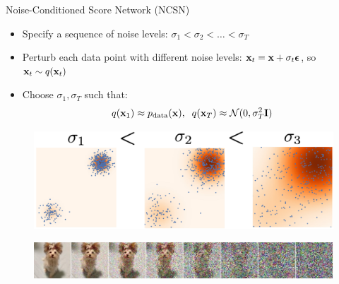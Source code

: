\documentclass{beamer}
\begin{document}
\begin{frame}{Noise-Conditioned Score Network (NCSN)}
	\begin{itemize}
		\item Specify a sequence of noise levels: $\sigma_1 < \sigma_2 < \dots < \sigma_T$
		\item Perturb each data point with different noise levels: $\mathbf{x}_t = \mathbf{x} + \sigma_t \boldsymbol{\epsilon}$, so $\mathbf{x}_t \sim q(\mathbf{x}_t)$
		\item Choose $\sigma_1, \sigma_T$ such that:
		\[
			q(\mathbf{x}_1) \approx p_{\text{data}}(\mathbf{x}), \;\; q(\mathbf{x}_T) \approx \mathcal{N}(0, \sigma_T^2 \mathbf{I})
		\]
	\end{itemize}
    \eqpause
	\vspace{-0.3cm}
	\begin{figure}
		\includegraphics[width=0.6\linewidth]{figs/multi_scale}
	\end{figure}
	\begin{figure}
		\includegraphics[width=\linewidth]{figs/duoduo}
	\end{figure}
\end{frame}
\end{document}
